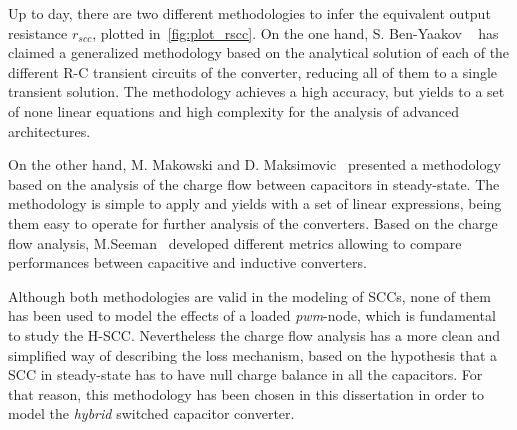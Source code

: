 Up to day, there are two different methodologies to infer the equivalent output resistance $r_{scc}$, plotted in~\ref{fig:plot_rscc}. On the one hand, S. Ben-Yaakov  ~\cite{2009Ben-Yaakov,2012Ben-Yaakov,2013Evzelman} has claimed a generalized methodology based on the analytical solution of each of the different R-C transient circuits of the converter, reducing all of them to a single transient solution. The methodology achieves a high accuracy, but yields to a set of none linear equations and high complexity for the analysis of advanced architectures.

On the other hand,  M. Makowski and D. Maksimovic~\cite{95Makowski} presented a methodology based on the analysis of the charge flow between capacitors in steady-state. The methodology is simple to apply and yields with a set of linear expressions, being them easy to operate for further analysis of the converters. Based on the charge flow analysis, M.Seeman~\cite{Seeman:EECS-2009-78} developed different metrics allowing to compare performances between capacitive and inductive converters.

Although both methodologies are valid in the modeling of SCCs, none of them has been used to model the effects of a loaded \emph{pwm}-node, which is fundamental to study the H-SCC.  Nevertheless the charge flow analysis has a more clean and simplified way of describing the loss mechanism, based on the hypothesis that a SCC in steady-state has to have null charge balance in all the capacitors. For that reason, this methodology has been chosen in this dissertation in order to model the \emph{hybrid} switched capacitor converter.

